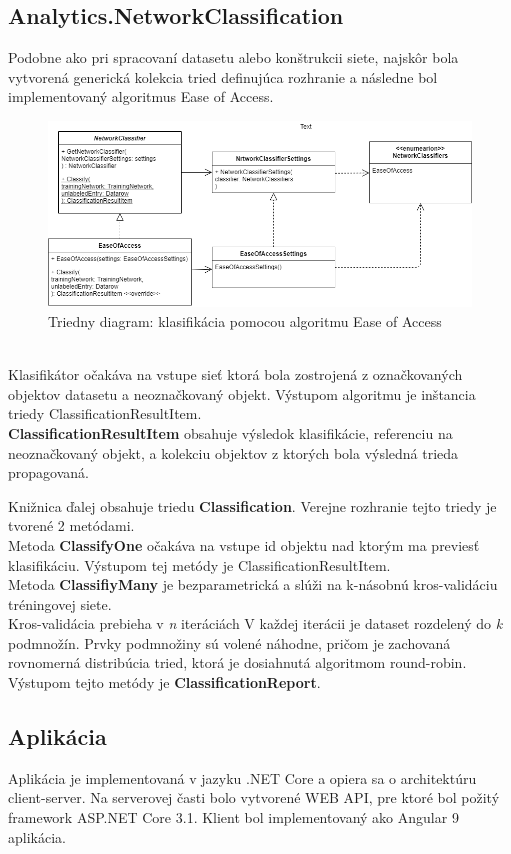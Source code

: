 \documentclass[slovak,master,dept460,male,cpp,cpdeclaration]{diploma}
\begin{document}
\subsection{Analytics.NetworkClassification}
Podobne ako pri spracovaní datasetu alebo konštrukcii siete, najskôr bola vytvorená generická kolekcia tried definujúca rozhranie a následne bol implementovaný algoritmus Ease of Access.
\begin{figure}[H]
\includegraphics[width=\textwidth]{classificator.png}
\caption{Triedny diagram: klasifikácia pomocou algoritmu Ease of Access }
\end{figure} \\
Klasifikátor očakáva na vstupe sieť ktorá bola zostrojená z označkovaných objektov datasetu a neoznačkovaný objekt. Výstupom algoritmu je inštancia triedy ClassificationResultItem. \\
\textbf{ClassificationResultItem} obsahuje výsledok klasifikácie, referenciu na neoznačkovaný objekt, a kolekciu objektov z ktorých bola výsledná trieda propagovaná.

Knižnica ďalej obsahuje triedu \textbf{Classification}.
Verejne rozhranie tejto triedy je tvorené 2 metódami. \\
Metoda \textbf{ClassifyOne} očakáva na vstupe id objektu nad ktorým ma previesť klasifikáciu. Výstupom tej metódy je ClassificationResultItem. \\
Metoda \textbf{ClassifiyMany} je bezparametrická a slúži na k-násobnú kros-validáciu tréningovej siete. \\
Kros-validácia prebieha v \textit{n} iteráciách V každej iterácii je dataset rozdelený do \textit{k} podmnožín. Prvky podmnožiny sú volené náhodne, pričom je zachovaná rovnomerná distribúcia tried, ktorá je dosiahnutá algoritmom round-robin.\\
Výstupom tejto metódy je \textbf{ClassificationReport}.

\subsection{Aplikácia}
Aplikácia je implementovaná v jazyku .NET Core a opiera sa o architektúru client-server. Na serverovej časti bolo vytvorené WEB API, pre ktoré bol požitý framework ASP.NET Core 3.1. Klient bol implementovaný ako Angular 9 aplikácia. \\
\end{document}
